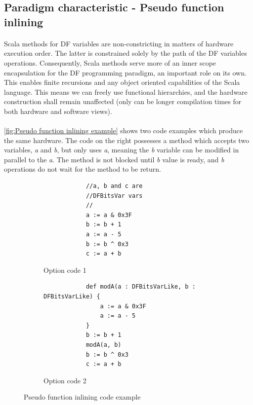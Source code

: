 \subsection{Paradigm characteristic - Pseudo function inlining}
\paragraph{}Scala methods for DF variables are non-constricting in matters of hardware execution order. The latter is constrained solely by the path of the DF variables operations. Consequently, Scala methods serve more of an inner scope encapsulation for the DF programming paradigm, an important role on its own. This enables finite recursions and any object oriented capabilities of the Scala language. This means we can freely use functional hierarchies, and the hardware construction shall remain unaffected (only can be longer compilation times for both hardware and software views).

\paragraph{}\autoref{fig:Pseudo function inlining example} shows two code examples which produce the same hardware. The code on the right possesses a method which accepts two variables, \textit{a} and \textit{b}, but only uses \textit{a}, meaning the \textit{b} variable can be modified in parallel to the \textit{a}. The method is not blocked until \textit{b} value is ready, and \textit{b} operations do not wait for the method to be return.
\begin{figure}[h]
	\centering
	\begin{subfigure}[b]{0.29\textwidth}
		\begin{verbatim}
			//a, b and c are 
			//DFBitsVar vars
			//
			a := a & 0x3F
			b := b + 1
			a := a - 5
			b := b ^ 0x3
			c := a + b
		\end{verbatim}
		\caption{Option code 1}
		\vspace*{4mm}
	\end{subfigure}%
	\hfill
	\begin{subfigure}[b]{0.69\textwidth}
		\begin{verbatim}
			def modA(a : DFBitsVarLike, b : DFBitsVarLike) {
				a := a & 0x3F
				a := a - 5
			}
			b := b + 1
			modA(a, b)
			b := b ^ 0x3
			c := a + b
		\end{verbatim}
		\caption{Option code 2}
		\vspace*{4mm}
	\end{subfigure}
	\caption{Pseudo function inlining code example}\label{fig:Pseudo function inlining example}
\end{figure}

